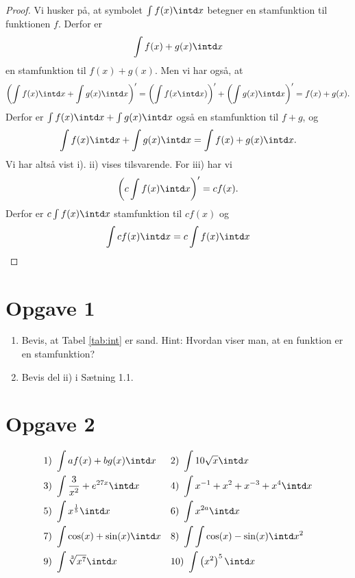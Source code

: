 \begin{proof}
Vi husker på, at symbolet $\int f(x) \intd x$ betegner en stamfunktion til funktionen $f$. Derfor er 
\begin{align*}
\int f(x) + g(x) \intd x
\end{align*}
en stamfunktion til $f(x) + g(x)$. Men vi har også, at
\begin{align*}
\left(\int f(x) \intd x + \int g(x) \intd x\right)' = \left(\int f(x \intd x)\right)'+\left( \int g(x) \intd x\right)' = f(x) + g(x).
\end{align*}
Derfor er $\int f(x) \intd x + \int g(x) \intd x$ også en stamfunktion til $f+g$, og 
\begin{align*}
\int f(x) \intd x + \int g(x) \intd x = \int f(x)+g(x) \intd x.
\end{align*}
Vi har altså vist i). ii) vises tilsvarende. For iii) har vi
\begin{align*}
\left(c\int f(x) \intd x\right)' = cf(x). 
\end{align*}
Derfor er $c\int f(x) \intd x$ stamfunktion til $cf(x)$ og 
\begin{align*}
\int cf(x) \intd x = c\int f(x) \intd x
\end{align*}
\end{proof}

\section*{Opgave 1}
\begin{enumerate}[label=\roman*)]
\item
Bevis, at Tabel \ref{tab:int} er sand. Hint: Hvordan viser man, at en funktion er en stamfunktion?
\item
Bevis del ii) i Sætning 1.1.
\end{enumerate}
\section*{Opgave 2}
\begin{align*}
&1) \ \int af(x)+bg(x) \intd x   &&2) \ \int 10\sqrt{x} \intd x     \\
&3) \ \int \frac{3}{x^2} + e^{27x} \intd x  &&4) \ \int x^{-1} + x^2+x^{-3}+x^{4} \intd x     \\
&5) \ \int x^{\frac{1}{5}} \intd x  &&6) \ \int x^{2a} \intd x     \\
&7) \ \int \cos(x) + \sin(x) \intd x  &&8) \ \int\int \cos(x)-\sin(x) \intd x^2   \\
&9) \ \int \sqrt[3]{x^{7}} \intd x  &&10) \ \int \left(x^{2}\right)^{5} \intd x    \\
\end{align*}